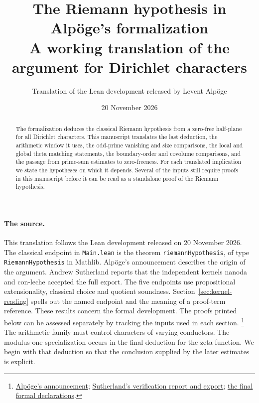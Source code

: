 \documentclass[10pt]{article}
\title{The Riemann hypothesis in Alpöge's formalization\\[4pt]
\large A working translation of the argument for Dirichlet characters}
\author{Translation of the Lean development released by Levent Alpöge}
\date{20 November 2026}
\newcommand{\srcid}[1]{\nolinkurl{#1}}
\begin{document}
\maketitle
\begin{abstract}
The formalization deduces the classical Riemann hypothesis from a
zero-free half-plane for all Dirichlet characters. This manuscript translates
the last deduction, the arithmetic window it uses, the odd-prime vanishing and size comparisons, the local and global theta
matching statements, the boundary-order and covolume comparisons, and the passage from prime-sum estimates to zero-freeness.
For each translated implication we state the hypotheses on which it depends.
Several of the inputs still require proofs in this manuscript before it can
be read as a standalone proof of the Riemann hypothesis.
\end{abstract}
\tableofcontents
\clearpage
\paragraph{The source.}
This translation follows the Lean development released on 20 November 2026.
The classical endpoint in \srcid{Main.lean} is the theorem
\srcid{riemannHypothesis}, of type \srcid{RiemannHypothesis} in Mathlib.
Alpöge's announcement describes the origin of the argument. Andrew Sutherland
reports that the independent kernels nanoda and con-leche accepted the 
full export. The five endpoints use propositional extensionality, classical
choice and quotient soundness. Section~\ref{sec:kernel-reading} spells out
the named endpoint and the meaning of a proof-term reference.
These results concern the formal development. The proofs printed below can be
assessed separately by tracking the inputs used in each section.
\footnote{\href{https://alpo.ge/remark.pdf}{Alpöge's announcement};
\href{https://math.mit.edu/~drew/grh/}{Sutherland's verification report and
export}; \href{https://github.com/Deicyde/riemann-hypothesis/blob/40e56bab026552e089d7afcfeff08d2defb9c005/src/Main.lean}{the final formal declarations}.}
The arithmetic family must control characters of varying conductors. The
modulus-one specialization occurs in the final deduction for the zeta
function. We begin with that deduction so that the conclusion supplied by the
later estimates is explicit.
\end{document}
